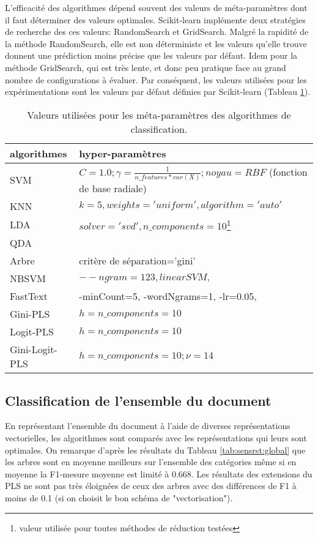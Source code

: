 L'efficacité des algorithmes dépend souvent des valeurs de méta-paramètres dont il faut déterminer des valeurs optimales. Scikit-learn implémente deux stratégies de recherche des ces valeurs: RandomSearch et GridSearch. Malgré la rapidité de la méthode RandomSearch, elle est non déterministe et les valeurs qu'elle trouve donnent une prédiction moins précise que les valeurs par défaut. Idem pour la méthode GridSearch, qui est très lente, et donc peu pratique face au grand nombre de configurations à évaluer. Par conséquent, les valeurs utilisées pour les expérimentations sont les valeurs par défaut définies par Scikit-learn (Tableau \ref{tab:sensrst:metapara}).

\begin{table}[htb]
	\scriptsize
	\centering
	\begin{tabular}{|l|p{}|}
		\hline
		algorithmes & hyper-paramètres\\ \hline
		SVM & $C=1.0; \gamma=\frac{1}{n\_features * var(X)}; noyau=RBF$ (fonction de base radiale)\\ \hline
		KNN & $k = 5, weights='uniform', algorithm='auto'$ \\ \hline
		LDA &  $solver='svd', n\_components=10$\footnote{valeur utilisée pour toutes méthodes de réduction testées}  \\ \hline
		QDA &   \\ \hline
		Arbre & critère de séparation='gini' \\ \hline
		NBSVM & $--ngram=123, linearSVM, $ \\ \hline
		FastText & -minCount=5, -wordNgrams=1, -lr=0.05,    \\ \hline
		Gini-PLS & $h=n\_components=10$ \\ \hline
		Logit-PLS & $h=n\_components=10$  \\ \hline
		Gini-Logit-PLS & $h=n\_components=10; \nu = 14$ \\ \hline
	\end{tabular}
	\caption{Valeurs utilisées pour les méta-paramètres des algorithmes de classification.}\label{tab:sensrst:metapara}
\end{table}

%
\subsection{Classification de l'ensemble du document}

En représentant l'ensemble du document à l'aide de diverses représentations vectorielles, les algorithmes sont comparés avec les représentations qui leurs sont optimales. On remarque d'après les résultats du Tableau \ref{tab:sensrst:global} que les arbres sont en moyenne meilleurs sur l'ensemble des catégories même si en moyenne la F1-mesure moyenne est limité à 0.668. Les résultats des extensions du PLS ne sont pas très éloignées de ceux des arbres avec des différences de F1 à moins de 0.1 (si on choisit le bon schéma de "vectorisation").

